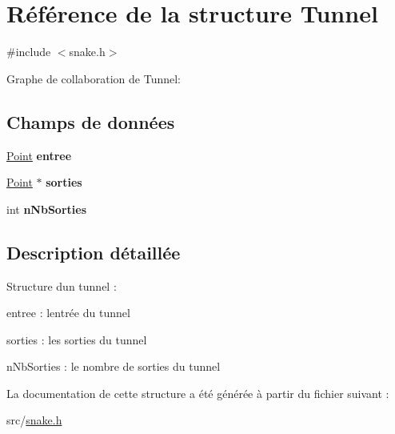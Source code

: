 \hypertarget{struct_tunnel}{}\section{Référence de la structure Tunnel}
\label{struct_tunnel}


{\ttfamily \#include $<$snake.\+h$>$}



Graphe de collaboration de Tunnel\+:
\subsection*{Champs de données}
\begin{DoxyCompactItemize}
\item 
\hyperlink{struct_point}{Point} {\bfseries entree}\hypertarget{struct_tunnel_a9e79e5f5fce3fbb06060627bdb4ac33a}{}\label{struct_tunnel_a9e79e5f5fce3fbb06060627bdb4ac33a}

\item 
\hyperlink{struct_point}{Point} $\ast$ {\bfseries sorties}\hypertarget{struct_tunnel_a3cdb3ca4b41618eeee9846bbffcbb68c}{}\label{struct_tunnel_a3cdb3ca4b41618eeee9846bbffcbb68c}

\item 
int {\bfseries n\+Nb\+Sorties}\hypertarget{struct_tunnel_a2da1fff02f676a2338f5921a62515942}{}\label{struct_tunnel_a2da1fff02f676a2338f5921a62515942}

\end{DoxyCompactItemize}


\subsection{Description détaillée}
Structure d\textquotesingle{}un tunnel \+:
\begin{DoxyItemize}
\item entree \+: l\textquotesingle{}entrée du tunnel
\item sorties \+: les sorties du tunnel
\item n\+Nb\+Sorties \+: le nombre de sorties du tunnel 
\end{DoxyItemize}

La documentation de cette structure a été générée à partir du fichier suivant \+:\begin{DoxyCompactItemize}
\item 
src/\hyperlink{snake_8h}{snake.\+h}\end{DoxyCompactItemize}
